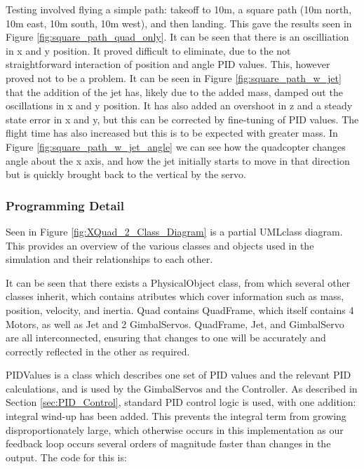 \documentclass[11pt]{article}
\begin{document}
Testing involved flying a simple path: takeoff to 10m, a square path (10m north, 10m east, 10m south, 10m west), and then landing. This gave the results seen in Figure \ref{fig:square_path_quad_only}. It can be seen that there is an oscilliation in x and y position. It proved difficult to eliminate, due to the not straightforward interaction of position and angle PID values. This, however proved not to be a problem. It can be seen in Figure \ref{fig:square_path_w_jet} that the addition of the jet has, likely due to the added mass, damped out the oscillations in x and y position. It has also added an overshoot in z and a steady state error in x and y, but this can be corrected by fine-tuning of PID values. The flight time has also increased but this is to be expected with greater mass. In Figure \ref{fig:square_path_w_jet_angle} we can see how the quadcopter changes angle about the x axis, and how the jet initially starts to move in that direction but is quickly brought back to the vertical by the servo.



\subsubsection{Programming Detail}
Seen in Figure \ref{fig:XQuad_2_Class_Diagram}
is a partial UML\footnotemark class diagram. This provides an overview of the various classes and objects used in the simulation and their relationships to each other.

It can be seen that there exists a PhysicalObject class, from which several other classes inherit, which contains atributes which cover information such as mass, position, velocity, and inertia. Quad contains QuadFrame, which itself contains 4 Motors, as well as Jet and 2 GimbalServos. QuadFrame, Jet, and GimbalServo are all interconnected, ensuring that changes to one will be accurately and correctly reflected in the other as required.

PID\textunderscore Values is a class which describes one set of PID values and the relevant PID calculations, and is used by the GimbalServos and the Controller. As described in Section \ref{sec:PID_Control}, standard PID control logic is used, with one addition: integral wind-up has been added. This prevents the integral term from growing disproportionately large, which otherwise occurs in this implementation as our feedback loop occurs several orders of magnitude faster than changes in the output. The code for this is:
\end{document}
